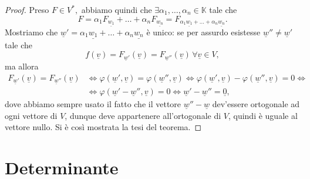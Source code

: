 \begin{proof}
    Preso $F \in V^\ast,$ abbiamo quindi che $\exists \alpha_1, \ldots, \alpha_n \in \mathbb{K}$ tale che
    $$
        F = \alpha_1 F_{\underline{w_1}} + \ldots + \alpha_n F_{\underline{w_n}} = F_{\alpha_1 \underline{w_1} + \ldots + \alpha_n \underline{w_n}}.
    $$
    Mostriamo che $\underline{w}' = \alpha_1 \underline{w_1} + \ldots + \alpha_n \underline{w_n}$ è unico: se per assurdo esistesse $\underline{w}'' \neq \underline{w}'$ tale che
    $$
        f(\underline{v}) = F_{\underline{w}'}(\underline{v}) = F_{\underline{w}''}(\underline{v}) \, \forall \underline{v} \in V,
    $$
    ma allora
    \begin{align}
        F_{\underline{w}'}(\underline{v}) = F_{\underline{w}''}(\underline{v}) &\iff \varphi(\underline{w}', \underline{v}) = \varphi(\underline{w}'', \underline{v}) \iff \varphi(\underline{w}', \underline{v}) - \varphi(\underline{w}'', \underline{v}) = 0 \iff \\
        &\iff \varphi(\underline{w}' - \underline{w}'', \underline{v}) = 0 \iff \underline{w}' - \underline{w}'' = \underline{0},
    \end{align}
    dove abbiamo sempre usato il fatto che il vettore $\underline{w}'' - \underline{w}$ dev'essere ortogonale ad ogni vettore di $V$, dunque deve appartenere all'ortogonale di $V$, quindi è uguale al vettore nullo. Si è così mostrata la tesi del teorema.
\end{proof}

\section{Determinante}

